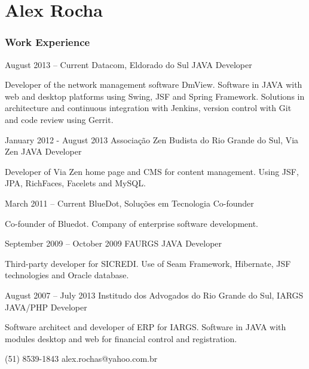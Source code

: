 \documentclass{tccv}
\begin{document}
\part{Alex Rocha}

\section{Work Experience}

\begin{eventlist}

\item{August 2013 -- Current}
    {Datacom, Eldorado do Sul}
    {JAVA Developer}

    Developer of the network management software DmView. Software in JAVA
    with web and desktop platforms using Swing, JSF and Spring Framework. Solutions
    in architecture and continuous integration with Jenkins, version control with Git
    and code review using Gerrit.

\item{January 2012 - August 2013}
    {Associação Zen Budista do Rio Grande do Sul, Via Zen}
    {JAVA Developer}

    Developer of Via Zen home page and CMS for content management. Using JSF, JPA, RichFaces, Facelets and MySQL.

\item{March 2011 -- Current}
    {BlueDot, Soluções em Tecnologia}
    {Co-founder}

    Co-founder of Bluedot. Company of enterprise software development.

\item{September 2009 -- October 2009}
    {FAURGS}
    {JAVA Developer}

    Third-party developer for SICREDI\@. Use of Seam Framework, Hibernate, JSF technologies and Oracle
    database.

\item{August 2007 -- July 2013}
    {Institudo dos Advogados do Rio Grande do Sul, IARGS}
    {JAVA/PHP Developer}

    Software architect and developer of ERP for IARGS\@. Software in JAVA with modules desktop and web for financial control and
    registration.

\end{eventlist}

{(51) 8539-1843 }
{alex.rochas@yahoo.com.br}
\end{document}

